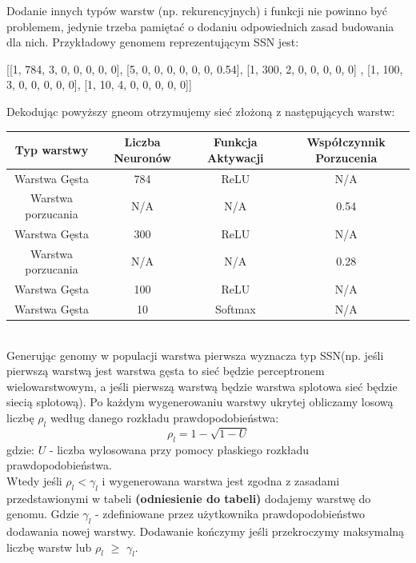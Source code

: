 \documentclass{article}
\begin{document}
Dodanie innych typów warstw (np. rekurencyjnych) i funkcji nie powinno być problemem, jedynie
trzeba pamiętać o dodaniu odpowiednich zasad budowania dla nich.
Przykładowy genomem reprezentującym SSN jest:
\begin{center}
	[[1, 784, 3, 0, 0, 0, 0, 0], [5, 0, 0, 0, 0, 0, 0, 0.54], [1, 300, 2, 0, 0, 0, 0, 0] 
	\newline
	  [5, 0, 0, 0, 0, 0, 0, 0.28], [1, 100, 3, 0, 0, 0, 0, 0], [1, 10, 4, 0, 0, 0, 0, 0]]
\end{center}
Dekodując powyższy gneom otrzymujemy sieć złożoną z następujących warstw:\\
\begin{tabular}{|c|c|c|c|}
	\hline
	Typ warstwy & Liczba Neuronów & Funkcja Aktywacji & Współczynnik Porzucenia \\
	\hline
	Warstwa Gęsta & 784 & ReLU & N/A \\
	Warstwa porzucania & N/A & N/A & 0.54\\
	Warstwa Gęsta & 300 & ReLU & N/A \\
	Warstwa porzucania & N/A & N/A & 0.28\\
	Warstwa Gęsta & 100 & ReLU & N/A \\
	Warstwa Gęsta & 10 & Softmax & N/A \\
	\hline
\end{tabular}
\\
Generując genomy w populacji warstwa pierwsza wyznacza typ SSN(np. jeśli pierwszą warstwą
jest warstwa gęsta to sieć będzie perceptronem wielowarstwowym, a jeśli pierwszą warstwą
będzie warstwa splotowa sieć będzie siecią splotową).
Po każdym wygenerowaniu warstwy ukrytej obliczamy losową liczbę $\rho_l$ według danego
rozkładu prawdopodobieństwa:
\begin{equation}
	\rho_l = 1 - \sqrt{1 - U}
\end{equation}
gdzie: $U$ - liczba wylosowana przy pomocy płaskiego rozkładu prawdopodobieństwa. \\
Wtedy jeśli $\rho_l < \gamma_l$ i wygenerowana warstwa jest zgodna z zasadami przedstawionymi
w tabeli \textbf{(odniesienie do tabeli)} dodajemy warstwę do genomu. 
Gdzie $\gamma_l$ - zdefiniowane przez użytkownika prawdopodobieństwo dodawania nowej warstwy.
Dodawanie kończymy jeśli przekroczymy maksymalną liczbę warstw lub $\rho_l$ $\geq$ $\gamma_l$.
\end{document}
